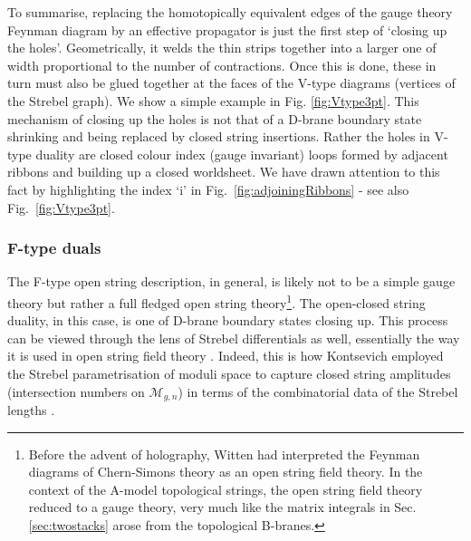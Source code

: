 \documentclass[english]{article}
\let\mc=\mathcal
\begin{document}
To summarise, replacing the homotopically equivalent edges of the gauge theory Feynman diagram by an effective propagator is just the first step of `closing up the holes'. Geometrically, it welds the thin strips together into a larger one of width proportional to the number of contractions. Once this is done, these in turn must also be glued together at the faces of the V-type diagrams (vertices of the Strebel graph). We show a simple example in Fig. \ref{fig:Vtype3pt}. 
This mechanism of closing up the holes is not that of a D-brane boundary state shrinking and being replaced by closed string insertions. 
Rather the holes in V-type duality are closed colour index (gauge invariant) loops formed by adjacent ribbons and building up a closed worldsheet. We have drawn attention to this fact by highlighting the index `i' in Fig.~\ref{fig:adjoiningRibbons} - see also Fig.~\ref{fig:Vtype3pt}.  


\subsubsection*{F-type duals}

The F-type open string description, in general, is likely not to be a simple gauge theory but rather a full fledged open string theory\footnote{Before the advent of holography, Witten had interpreted the Feynman diagrams of Chern-Simons theory as an open string field theory\cite{WittenCSasOSFT}. In the context of the A-model topological strings, the open string field theory reduced to a gauge theory, very much like the matrix integrals in Sec. \ref{sec:twostacks} arose from the topological B-branes.}. The open-closed string duality, in this case, is one of D-brane boundary states closing up. This process can be viewed through the lens of Strebel differentials as well, essentially the way it is used in open string field theory \cite{ZwiebachProof}. Indeed, this is how Kontsevich employed the Strebel parametrisation of moduli space to capture closed string amplitudes (intersection numbers on $\mc{M}_{g,n}$) in terms of the combinatorial data of the Strebel lengths \cite{KontsevichAiry}.  
\end{document}

